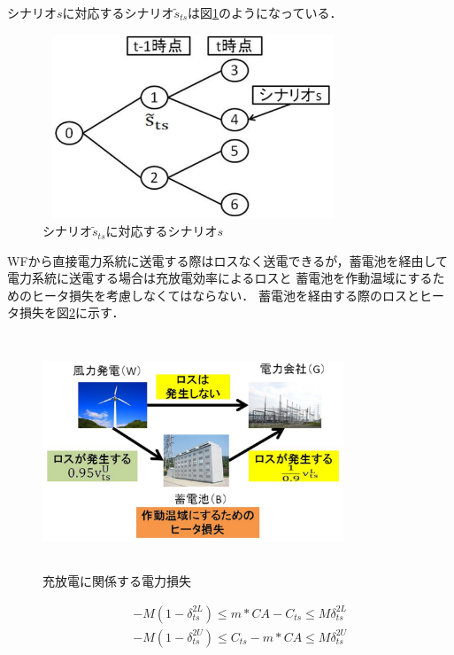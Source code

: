 \documentclass[a4paper,12pt,showkeys]{jreport}
\begin{document}
シナリオ$s$に対応するシナリオ$\tilde{s}_{ts}$は図\ref{fig:henka}のようになっている．



\begin{figure}[h]
\centering
\includegraphics[width=9cm,height=5.5cm, clip]{henka.eps}
\caption{シナリオ$\tilde{s}_{ts}$に対応するシナリオ$s$}
\label{fig:henka}
\end{figure}

WFから直接電力系統に送電する際はロスなく送電できるが，蓄電池を経由して電力系統に送電する場合は充放電効率によるロスと
蓄電池を作動温域にするためのヒータ損失を考慮しなくてはならない．
蓄電池を経由する際のロスとヒータ損失を図\ref{fig:loss}に示す．

\begin{figure}[h]
\centering
\includegraphics[width=9cm,height=7cm, clip]{loss.eps}
\caption{充放電に関係する電力損失}
\label{fig:loss}
\end{figure}

\begin{eqnarray}
&& - M (1 - \delta^{2L}_{ts}) \le m * CA - C_{ts} \le M \delta^{2L}_{ts}
\label{eq:con9} \\
&& - M (1 - \delta^{2U}_{ts}) \le C_{ts} - m * CA \le M \delta^{2U}_{ts}
\label{eq:con10}
\end{eqnarray}
\end{document}
